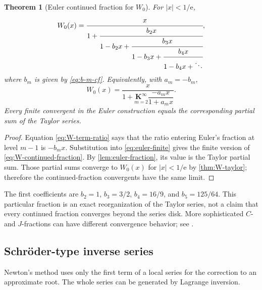 \documentclass[11pt]{article}
\numberwithin{equation}{section}
\newtheorem{theorem}{Theorem}[section]
\theoremstyle{definition}
\theoremstyle{remark}
\newcommand{\e}{\mathrm e}
\begin{document}
\begin{theorem}[Euler continued fraction for $W_0$]
\label{thm:W-continued-fraction}
For $|x|<1/\e$,
\begin{equation}
 W_0(x)=
 \cfrac{x}{1+
  \cfrac{b_2x}{1-b_2x+
  \cfrac{b_3x}{1-b_3x+
  \cfrac{b_4x}{1-b_4x+\ddots}}}},                    \label{eq:W-continued-fraction}
\end{equation}
where $b_m$ is given by \eqref{eq:b-m-cf}.  Equivalently, with
$a_m=-b_m$,
\begin{equation}
 W_0(x)=\frac{x}{1+
   \underset{m=2}{\mathbf K^\infty}
     \dfrac{-a_mx}{1+a_mx}}.                          \label{eq:W-associated-fraction}
\end{equation}
Every finite convergent in the Euler construction equals the corresponding
partial sum of the Taylor series.
\end{theorem}

\begin{proof}
Equation \eqref{eq:W-term-ratio} says that the ratio entering Euler's
fraction at level $m-1$ is $-b_mx$.  Substitution into
\eqref{eq:euler-finite} gives the finite version of
\eqref{eq:W-continued-fraction}.  By
\cref{lem:euler-fraction}, its value is the Taylor partial sum.  Those partial
sums converge to $W_0(x)$ for $|x|<1/\e$ by
\cref{thm:W-taylor}; therefore the continued-fraction convergents have the
same limit.
\end{proof}

The first coefficients are $b_2=1$, $b_3=3/2$, $b_4=16/9$, and
$b_5=125/64$.  This particular fraction is an exact reorganization of the
Taylor series, not a claim that every continued fraction converges beyond the
series disk.  More sophisticated $C$- and $J$-fractions can have different
convergence behavior; see \cite{Corcino2018}.

\subsection{Schröder-type inverse series}

Newton's method uses only the first term of a local series for the correction
to an approximate root.  The whole series can be generated by Lagrange
inversion.
\end{document}
